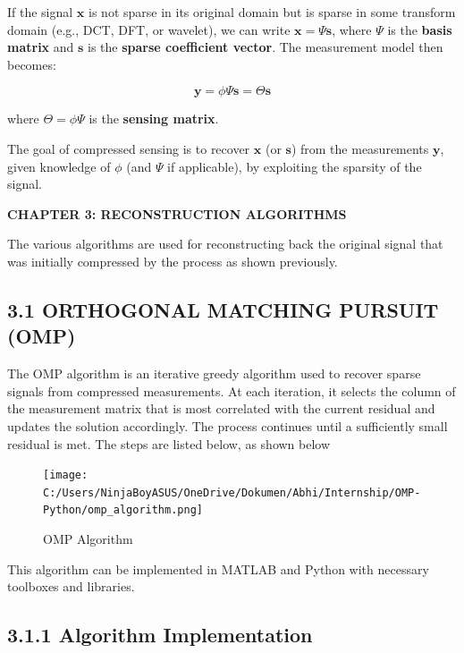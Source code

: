 \documentclass[
  letterpaper,
  DIV=11,
  numbers=noendperiod]{scrartcl}
\providecommand{\mainsection}[1]{\begin{center}{\rmfamily\textbf{\fontsize{14}{20}\selectfont #1}}\end{center}}
\begin{document}
If the signal \(\mathbf{x}\) is not sparse in its original domain but is
sparse in some transform domain (e.g., DCT, DFT, or wavelet), we can
write \(\mathbf{x} = \Psi \mathbf{s}\), where \(\Psi\) is the
\textbf{basis matrix} and \(\mathbf{s}\) is the \textbf{sparse
coefficient vector}. The measurement model then becomes:

\begin{equation}
  \mathbf{y} = \phi \Psi \mathbf{s} = \Theta \mathbf{s}
\end{equation}

where \(\Theta = \phi \Psi\) is the \textbf{sensing matrix}.

The goal of compressed sensing is to recover \(\mathbf{x}\) (or
\(\mathbf{s}\)) from the measurements \(\mathbf{y}\), given knowledge of
\(\phi\) (and \(\Psi\) if applicable), by exploiting the sparsity of the
signal.

\newpage
\mainsection{CHAPTER 3: RECONSTRUCTION ALGORITHMS}

The various algorithms are used for reconstructing back the original
signal that was initially compressed by the process as shown previously.

\subsection{3.1 ORTHOGONAL MATCHING PURSUIT
(OMP)}\label{orthogonal-matching-pursuit-omp}

The OMP algorithm is an iterative greedy algorithm used to recover
sparse signals from compressed measurements. At each iteration, it
selects the column of the measurement matrix that is most correlated
with the current residual and updates the solution accordingly. The
process continues until a sufficiently small residual is met. The steps
are listed below, as shown below

\begin{figure}[H]

{\centering \texttt{[image: C:/Users/NinjaBoyASUS/OneDrive/Dokumen/Abhi/Internship/OMP-Python/omp\_algorithm.png]}

}

\caption{OMP Algorithm\autocite{omp-intro}}

\end{figure}%

This algorithm can be implemented in MATLAB and Python with necessary
toolboxes and libraries.

\subsection{3.1.1 Algorithm
Implementation}\label{algorithm-implementation}
\end{document}
